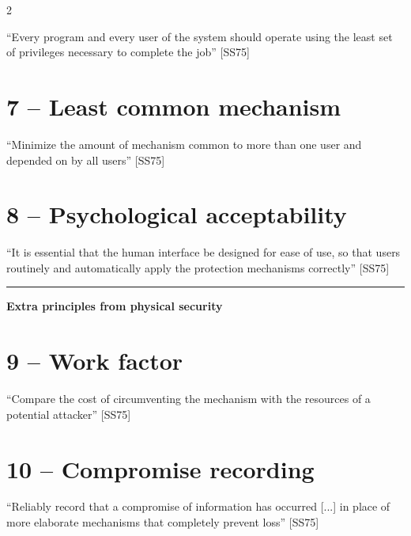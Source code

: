 \documentclass[a4paper,9pt]{extarticle}
\newcommand{\separator}{
\vspace{2pt}
\hrule
\vspace{3pt}
}
\begin{document}
\begin{multicols}{2}
\begin{important}

``Every program and every user of the system should operate using the
least set of privileges necessary to complete the job'' [SS75]

\end{important}



\section{7 -- Least common mechanism}


\begin{important}

``Minimize the amount of mechanism common to more than one
user and depended on by all users'' [SS75]

\end{important}



\section{8 -- Psychological acceptability}


\begin{important}

``It is essential that the human interface be designed for ease of use, so that users
routinely and automatically apply the protection mechanisms correctly'' [SS75]

\end{important}


\separator


\textbf{Extra principles from physical security}



\section{9 -- Work factor}


\begin{important}

``Compare the cost of circumventing the mechanism with
the resources of a potential attacker'' [SS75]

\end{important}



\section{10 -- Compromise recording}


\begin{important}

``Reliably record that a compromise of information has occurred [...] in
place of more elaborate mechanisms that completely prevent loss'' [SS75]

\end{important}



\end{multicols}
\end{document}
